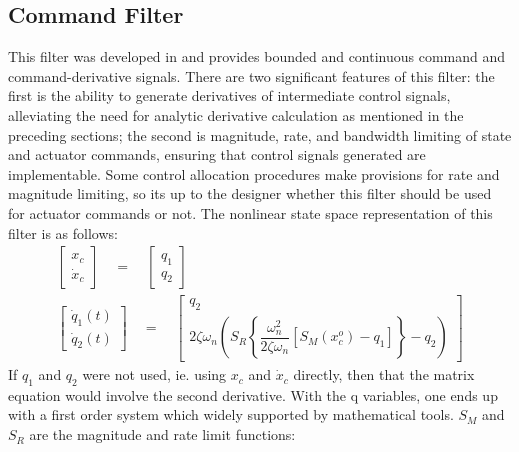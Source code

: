 \documentclass[12pt]{ucthesis}
\begin{document}
\subsection{Command Filter}
\label{sub: cmd_filter}
This filter was developed in \citet[Appendix A]{Farrell2005} and provides bounded and continuous command and command-derivative signals. There are two significant features of this filter: the first is the ability to generate derivatives of intermediate control signals, alleviating the need for analytic derivative calculation as mentioned in the preceding sections; the second is magnitude, rate, and bandwidth limiting of state and actuator commands, ensuring that control signals generated are implementable. Some control allocation procedures make provisions for rate and magnitude limiting, so its up to the designer whether this filter should be used for actuator commands or not. The nonlinear state space representation of this filter is as follows:
	\begin{gather} \label{eq: cmd_filter} %
		\left[ \begin{array}{c} x_c \\ \dot{x}_c \end{array} \right] \quad = \quad \left[ \begin{array}{c} q_1 \\ q_2 \end{array} \right] \\
		\left[ \begin{array}{c} \dot{q}_1(t) \\ \dot{q}_2(t) \end{array} \right] \quad = \quad \left[ \begin{array}{c} q_2 \\ 2\zeta\omega_n \left( S_R \left\lbrace \dfrac{\omega^2_n}{2\zeta\omega_n} \left[ S_M(x^o_c)-q_1 \right] \right\rbrace -q_2 \right) \end{array} \right]
	\end{gather}
%
If $q_1$ and $q_2$ were not used, ie. using $x_c$ and $\dot{x}_c$ directly, then that the matrix equation would involve the second derivative. With the q variables, one ends up with a first order system which widely supported by mathematical tools. $S_M$ and $S_R$ are the magnitude and rate limit functions:
\end{document}
